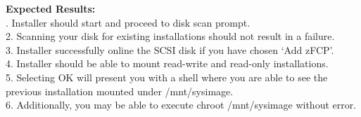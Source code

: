 \documentclass{article}
\begin{document}
\begin{figure}[H]        
\end{figure}
\noindent
\textbf{Expected Results:}\\
. Installer should start and proceed to disk scan prompt.\\
2. Scanning your disk for existing installations should not result in a
failure.\\
3. Installer successfully online the SCSI disk if you have chosen `Add zFCP'.\\
4. Installer should be able to mount read-write and read-only installations.\\
5. Selecting OK will present you with a shell where you are able to see the
previous installation mounted under /mnt/sysimage.\\
6. Additionally, you may be able to execute chroot /mnt/sysimage without error.\\
\end{document}
